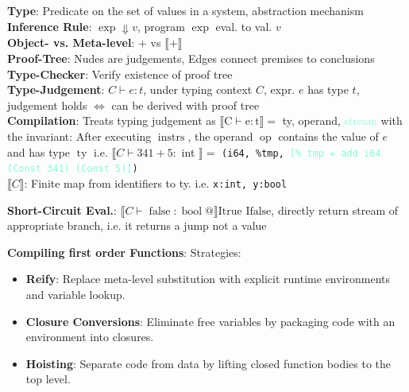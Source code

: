 \textbf{Type}: Predicate on the set of values in a system, abstraction mechanism 
\textbf{Inference Rule}: $\exp \Downarrow v$, program $\exp$ eval. to val. $v$\\
\textbf{Object- vs. Meta-level}: $+$ vs $\llbracket+\rrbracket$\\
\textbf{Proof-Tree}: Nudes are judgements, Edges connect premises to conclusions\\
\textbf{Type-Checker}: Verify existence of proof tree\\
\textbf{Type-Judgement}: $C \vdash e: t$, under typing context $C$, expr. $e$ has type $t$, judgement holds $\Leftrightarrow$ can be derived with proof tree\\

\textbf{Compilation}: Treats typing judgement as $\llbracket \mathrm{C} \vdash \mathrm{e}: \mathrm{t} \rrbracket=$ ty, operand, \textcolor{Aquamarine}{stream} with the invariant: After executing $\operatorname{instrs}$, the operand $\operatorname{op}$ contains the value of $e$ and has type $\operatorname{ty}$ i.e. $\llbracket C \vdash 341+5:$ int $\rrbracket=$ \texttt{(i64, \%tmp, \textcolor{Aquamarine}{[\% tmp = add i64 (Const 341) (Const 5)]})}\\
\textbf{$\llbracket C\rrbracket$}: Finite map from identifiers to ty. i.e. \texttt{x:int, y:bool}


\textbf{Short-Circuit Eval.}: $\llbracket C \vdash \operatorname{false} : \operatorname{bool}@ \rrbracket \text{Itrue} \text{ Ifalse}$, directly return stream of appropriate branch, i.e. it returns a jump not a value

\textbf{Compiling first order Functions}: Strategies:
\begin{itemize}[leftmargin = *,noitemsep]
\item \textbf{Reify}: Replace meta-level substitution with explicit runtime environments and variable lookup.
\item \textbf{Closure Conversions}: Eliminate free variables by packaging code with an environment into closures.
\item \textbf{Hoisting}: Separate code from data by lifting closed function bodies to the top level.
\end{itemize}


